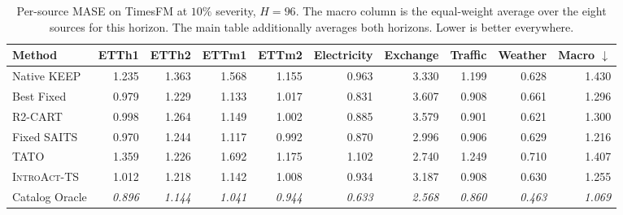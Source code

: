 \documentclass{article}
\newcommand{\oracle}[1]{\textit{\textcolor{phgray}{#1}}}
\newcommand{\introact}{\textsc{IntroAct-TS}}
\begin{document}
\begin{table}[!t]
  \caption{Per-source MASE on TimesFM at $10\%$ severity, $H=96$. The macro column is the
  equal-weight average over the eight sources for this horizon. The main table additionally averages both horizons. Lower is better everywhere.}
  \label{tab:app-src-tf-96}
  \centering
  \small
  \setlength{\tabcolsep}{3pt}
\begin{tabular*}{\textwidth}{@{\extracolsep{\fill}}lrrrrrrrrr@{}}
    \toprule
    Method & ETTh1 & ETTh2 & ETTm1 & ETTm2 & Electricity & Exchange & Traffic & Weather & Macro $\downarrow$ \\
    \midrule
    Native KEEP & 1.235 & 1.363 & 1.568 & 1.155 & 0.963 & 3.330 & 1.199 & 0.628 & 1.430 \\
    Best Fixed & 0.979 & 1.229 & 1.133 & 1.017 & 0.831 & 3.607 & 0.908 & 0.661 & 1.296 \\
    R2-CART & 0.998 & 1.264 & 1.149 & 1.002 & 0.885 & 3.579 & 0.901 & 0.621 & 1.300 \\
    Fixed SAITS & 0.970 & 1.244 & 1.117 & 0.992 & 0.870 & 2.996 & 0.906 & 0.629 & 1.216 \\
    TATO & 1.359 & 1.226 & 1.692 & 1.175 & 1.102 & 2.740 & 1.249 & 0.710 & 1.407 \\
    \midrule
    \rowcolor{bestgray}\introact{} & 1.012 & 1.218 & 1.142 & 1.008 & 0.934 & 3.187 & 0.908 & 0.630 & 1.255 \\
    \midrule
    Catalog Oracle & \oracle{0.896} & \oracle{1.144} & \oracle{1.041} & \oracle{0.944} & \oracle{0.633} & \oracle{2.568} & \oracle{0.860} & \oracle{0.463} & \oracle{1.069} \\
    \bottomrule
  \end{tabular*}
\end{table}
\end{document}
